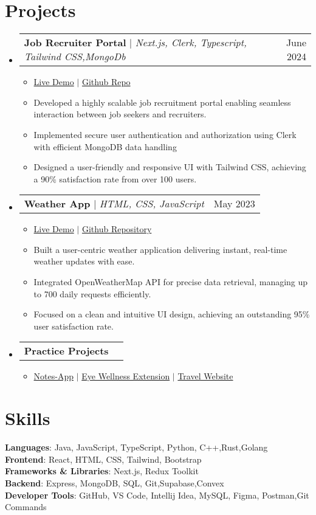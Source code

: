 \documentclass[letterpaper,11pt]{article}
\makeatletter
\newcommand{\resumeItem}[1]{
  \item\small{
    {#1 \vspace{-4pt}}
  }
}
\newcommand{\resumeProjectHeading}[2]{
    \item
    \begin{tabular*}{0.97\textwidth}{l@{\extracolsep{\fill}}r}
      \small#1 & #2 \\
    \end{tabular*}\vspace{-7pt}
}
\newcommand{\resumeSubHeadingListStart}{\begin{itemize}[leftmargin=0.15in, label={}]}
\newcommand{\resumeSubHeadingListEnd}{\end{itemize}}
\newcommand{\resumeItemListStart}{\begin{itemize}[leftmargin=0.15in]}
\newcommand{\resumeItemListEnd}{\end{itemize}\vspace{-6pt}}
\makeatother
\begin{document}
\section{Projects}
   \resumeSubHeadingListStart
     \resumeProjectHeading
         {\textbf{Job Recruiter Portal } $|$ \emph{Next.js, Clerk, Typescript, Tailwind CSS,MongoDb}}{June 2024}
         \resumeItemListStart
           \resumeItem{\href{https://job-recruiter-portal.vercel.app/} {Live Demo} $|$ \href{https://github.com/pjbeast23/JobRecruiterPortal} {Github Repo}}
           \resumeItem{Developed a highly scalable job recruitment portal enabling seamless interaction between job seekers and recruiters.}
           \resumeItem{Implemented secure user authentication and authorization using Clerk with efficient MongoDB data handling }
           \resumeItem{Designed a user-friendly and responsive UI with Tailwind CSS, achieving a 90\% satisfaction rate from over 100 users.}
         \resumeItemListEnd
     \resumeProjectHeading
         {\textbf{Weather App} $|$ \emph{HTML, CSS, JavaScript}}{May 2023}
         \resumeItemListStart
         \resumeItem{\href{https://gdsc-web-d.vercel.app/} {Live Demo} $|$ \href{https://github.com/pjbeast23/GDSC-WEB-D} {Github Repository}}
           \resumeItem{Built a user-centric weather application delivering instant, real-time weather updates with ease.}
           \resumeItem{Integrated OpenWeatherMap API for precise data retrieval, managing up to 700 daily requests efficiently.}
           \resumeItem{Focused on a clean and intuitive UI design, achieving an outstanding 95\% user satisfaction rate.}
         \resumeItemListEnd
     \resumeProjectHeading
         {\textbf{Practice Projects}}{}
         \resumeItemListStart
         \resumeItem{\href{https://github.com/pjbeast23/NotesApp-React} {Notes-App} $|$ \href{https://github.com/pjbeast23/Eye-Wellness-Extension} {Eye Wellness Extension} $|$ \href{https://github.com/pjbeast23/travel-website} {Travel Website}
         } 
         \resumeItemListEnd
   \resumeSubHeadingListEnd

\section{Skills}
 \begin{itemize}[leftmargin=0.15in, label={}]
    \small{\item{
     \textbf{Languages}{: Java, JavaScript, TypeScript, Python, C++,Rust,Golang} \\
    \textbf{Frontend}{: React, HTML, CSS, Tailwind, Bootstrap} \\
     \textbf{Frameworks \& Libraries}{: Next.js, Redux Toolkit} \\
    \textbf{Backend}{: Express, MongoDB, SQL, Git,Supabase,Convex} \\
     \textbf{Developer Tools}{: GitHub, VS Code, Intellij Idea, MySQL, Figma, Postman,Git Commands} \\
    }}
 \end{itemize}
\end{document}
